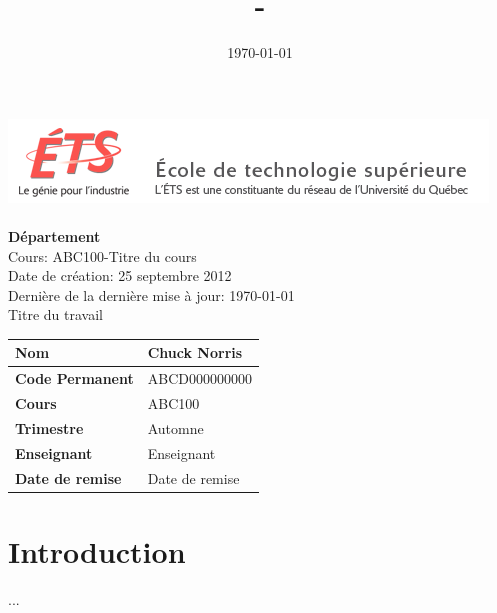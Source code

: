 \documentclass[12pt]{article}
\author{\nom}
\title{\ciglecours - \titredocument}
\date{\today}
\newcommand{\nom}{Chuck Norris}
\newcommand{\codepermanent}{ABCD000000000}
\newcommand{\trimestre}{Automne \the\year}
\newcommand{\departement}{Département}
\newcommand{\ciglecours}{ABC100}
\newcommand{\titrecours}{Titre du cours}
\newcommand{\enseignant}{Enseignant}
\newcommand{\titredocument}{Titre du travail}
\newcommand{\dateremise}{Date de remise}
\begin{document}
\noindent
\includegraphics[scale=0.80]{logo_ets.png} \\ \\
{\bf \departement} \\
Cours: \ciglecours\;-\;\titrecours \\
Date de création: 25 septembre 2012 \\
Dernière de la dernière mise à jour: \today \\

\noindent
{\Large \titredocument} \\

\noindent
\def\arraystretch{1.5}%
\begin{tabularx}{\textwidth}{|X|X|}
	\hline
	\textbf{Nom} & \nom \\ \hline
	\textbf{Code Permanent} & \codepermanent \\ \hline
	\textbf{Cours} & \ciglecours \\ \hline
	\textbf{Trimestre} & \trimestre \\ \hline
	\textbf{Enseignant} & \enseignant \\ \hline
	\textbf{Date de remise} & \dateremise \\ \hline
\end{tabularx}

\newpage

\tableofcontents \clearpage

\section{Introduction}
...
\end{document}
